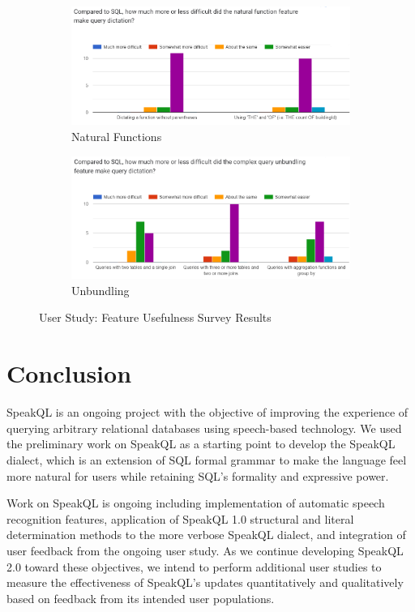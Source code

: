 \begin{figure}
  \begin{subfigure}[b]{\linewidth}
    \centering
    \includegraphics[width=\linewidth]{figures/survey-feedback/10-21-22-nat-func.png}
    \caption{Natural Functions}
  \end{subfigure}
  \begin{subfigure}[b]{\linewidth}
    \centering
    \includegraphics[width=\linewidth]{figures/survey-feedback/10-21-22-unbundling.png}
    \caption{Unbundling}
  \end{subfigure}
  \caption{User Study: Feature Usefulness Survey Results}
  \label{fig:surveyusefulnessgraphs}
\end{figure}

\thematiccoding


\section{Conclusion}


SpeakQL is an ongoing project with the objective of improving the experience of querying arbitrary relational databases using speech-based technology. We used the preliminary work on SpeakQL \cite{Shah2020} as a starting point to develop the SpeakQL dialect, which is an extension of SQL formal grammar to make the language feel more natural for users while retaining SQL's formality and expressive power.

Work on SpeakQL is ongoing including implementation of automatic speech recognition features, application of SpeakQL 1.0 structural and literal determination methods to the more verbose SpeakQL dialect, and integration of user feedback from the ongoing user study. As we continue developing SpeakQL 2.0 toward these objectives, we intend to perform additional user studies to measure the effectiveness of SpeakQL's updates quantitatively and qualitatively based on feedback from its intended user populations. 

